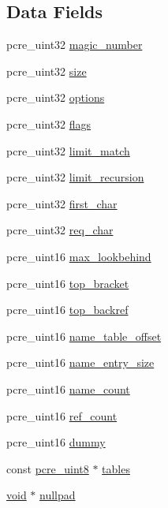 \subsection*{Data Fields}
\begin{DoxyCompactItemize}
\item 
pcre\+\_\+uint32 \hyperlink{structreal__pcre32_a9aad2d31791d08f6e946da7684276519}{magic\+\_\+number}
\item 
pcre\+\_\+uint32 \hyperlink{structreal__pcre32_a093cbf2eb3f2ef8e0408ca9bfb2ea871}{size}
\item 
pcre\+\_\+uint32 \hyperlink{structreal__pcre32_a9f19a3e6c1dc498c06faff8edf828ebb}{options}
\item 
pcre\+\_\+uint32 \hyperlink{structreal__pcre32_a7c71e0a5ae976d17bf35187cbce5aa0a}{flags}
\item 
pcre\+\_\+uint32 \hyperlink{structreal__pcre32_a1c5b69273114244b8dbd474aee5eb618}{limit\+\_\+match}
\item 
pcre\+\_\+uint32 \hyperlink{structreal__pcre32_aba5fa235ffb7552ce44cac2a38afad93}{limit\+\_\+recursion}
\item 
pcre\+\_\+uint32 \hyperlink{structreal__pcre32_a1ad89e237cf11d4b6dcdeacecacc19ef}{first\+\_\+char}
\item 
pcre\+\_\+uint32 \hyperlink{structreal__pcre32_a11e444cf16251cba5d70be1e5c5f3b5d}{req\+\_\+char}
\item 
pcre\+\_\+uint16 \hyperlink{structreal__pcre32_aaa2af86355e29c5f405e4019872d5356}{max\+\_\+lookbehind}
\item 
pcre\+\_\+uint16 \hyperlink{structreal__pcre32_a30544e16d634bb880cd9c330ab302fb8}{top\+\_\+bracket}
\item 
pcre\+\_\+uint16 \hyperlink{structreal__pcre32_a1e46f2e6e8fe9e7687c125e20bed60d3}{top\+\_\+backref}
\item 
pcre\+\_\+uint16 \hyperlink{structreal__pcre32_a984a1ab4206ba30fe6ba6f92493ea790}{name\+\_\+table\+\_\+offset}
\item 
pcre\+\_\+uint16 \hyperlink{structreal__pcre32_aa79089f39e9da1fbdfa15ccb130c6655}{name\+\_\+entry\+\_\+size}
\item 
pcre\+\_\+uint16 \hyperlink{structreal__pcre32_af4af3d04b0867f884ec23e0253674d52}{name\+\_\+count}
\item 
pcre\+\_\+uint16 \hyperlink{structreal__pcre32_a74d6733548d8fb2dd81faa70bf68969d}{ref\+\_\+count}
\item 
pcre\+\_\+uint16 \hyperlink{structreal__pcre32_a3f31fbbb06639e9a22ba32758b57fde9}{dummy}
\item 
const \hyperlink{pcre__internal_8h_a6e9105ffeed09883190f9bf30d93e210}{pcre\+\_\+uint8} $\ast$ \hyperlink{structreal__pcre32_a7b35b7b8eaff12876cf34fb4aa018705}{tables}
\item 
\hyperlink{group__MOD__ISAPI_gacd6cdbf73df3d9eed42fa493d9b621a6}{void} $\ast$ \hyperlink{structreal__pcre32_acd44d5a1a71b6fa18575621189a6f4cb}{nullpad}
\end{DoxyCompactItemize}



